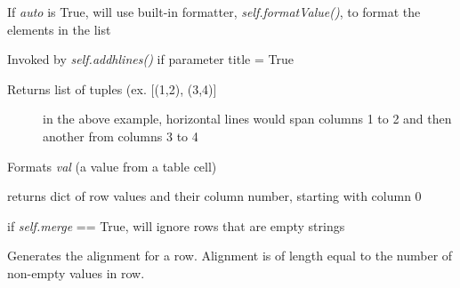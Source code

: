 \documentclass[letterpaper,10pt,english]{sphinxmanual}
\begin{document}
\begin{fulllineitems}
\begin{fulllineitems}
\end{fulllineitems}


\begin{fulllineitems}
\label{summary:tablemaker.Row.autoFormat}
If \emph{auto} is True, will use built-in formatter, \emph{self.formatValue()}, 
to format the elements in the list

\end{fulllineitems}


\begin{fulllineitems}
\label{summary:tablemaker.Row.buildHline}
Invoked by \emph{self.addhlines()} if parameter title = True
\begin{description}
\item[{Returns list of tuples (ex. {[}(1,2), (3,4){]}}] \leavevmode
in the above example, horizontal lines would
span columns 1 to 2 and then another from columns 3 to 4

\end{description}

\end{fulllineitems}


\begin{fulllineitems}
\label{summary:tablemaker.Row.formatValue}
Formats \emph{val} (a value from a table cell)

\end{fulllineitems}


\begin{fulllineitems}
\label{summary:tablemaker.Row.getValues}
returns dict of row values and their column number,
starting with column 0

if \emph{self.merge} == True, will ignore rows
that are empty strings

\end{fulllineitems}


\begin{fulllineitems}
\label{summary:tablemaker.Row.makeAlignment}
Generates the alignment for a row. Alignment is of
length equal to the number of non-empty values in row.


\end{fulllineitems}
\end{fulllineitems}
\end{document}
